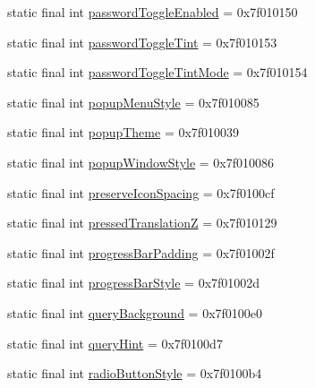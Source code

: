 \begin{CompactItemize}
\item 
static final int \hyperlink{classandroid_1_1support_1_1v7_1_1mediarouter_1_1_r_1_1attr_f23cd34b65cca03901bef44db634a351}{passwordToggleEnabled} = 0x7f010150
\item 
static final int \hyperlink{classandroid_1_1support_1_1v7_1_1mediarouter_1_1_r_1_1attr_0f81eb710b95ea7bf3b1059161ef0514}{passwordToggleTint} = 0x7f010153
\item 
static final int \hyperlink{classandroid_1_1support_1_1v7_1_1mediarouter_1_1_r_1_1attr_659c52155b8c2f20ee7eded305ee22af}{passwordToggleTintMode} = 0x7f010154
\item 
static final int \hyperlink{classandroid_1_1support_1_1v7_1_1mediarouter_1_1_r_1_1attr_d957ab3fce4442200fc81eb2946cb89a}{popupMenuStyle} = 0x7f010085
\item 
static final int \hyperlink{classandroid_1_1support_1_1v7_1_1mediarouter_1_1_r_1_1attr_c3f7a2dec112d38bbeb840edd1db2d1c}{popupTheme} = 0x7f010039
\item 
static final int \hyperlink{classandroid_1_1support_1_1v7_1_1mediarouter_1_1_r_1_1attr_092a5e7aabd689444009471c54772bdc}{popupWindowStyle} = 0x7f010086
\item 
static final int \hyperlink{classandroid_1_1support_1_1v7_1_1mediarouter_1_1_r_1_1attr_b267854cb53beac1706a77b766296000}{preserveIconSpacing} = 0x7f0100cf
\item 
static final int \hyperlink{classandroid_1_1support_1_1v7_1_1mediarouter_1_1_r_1_1attr_6d9d11ef9e05432f02b88c0982e5792b}{pressedTranslationZ} = 0x7f010129
\item 
static final int \hyperlink{classandroid_1_1support_1_1v7_1_1mediarouter_1_1_r_1_1attr_93ca2ead75fa8f165b93e96d33e32093}{progressBarPadding} = 0x7f01002f
\item 
static final int \hyperlink{classandroid_1_1support_1_1v7_1_1mediarouter_1_1_r_1_1attr_11dca063dae1b7001ae11066a91a4140}{progressBarStyle} = 0x7f01002d
\item 
static final int \hyperlink{classandroid_1_1support_1_1v7_1_1mediarouter_1_1_r_1_1attr_4e62ef797ceb9aed0f056d683d0a3620}{queryBackground} = 0x7f0100e0
\item 
static final int \hyperlink{classandroid_1_1support_1_1v7_1_1mediarouter_1_1_r_1_1attr_97e24b06a7a38a4ecf63ca591aac846f}{queryHint} = 0x7f0100d7
\item 
static final int \hyperlink{classandroid_1_1support_1_1v7_1_1mediarouter_1_1_r_1_1attr_8530d29823946fb3adc66657a0502998}{radioButtonStyle} = 0x7f0100b4
\item 

\end{CompactItemize}
